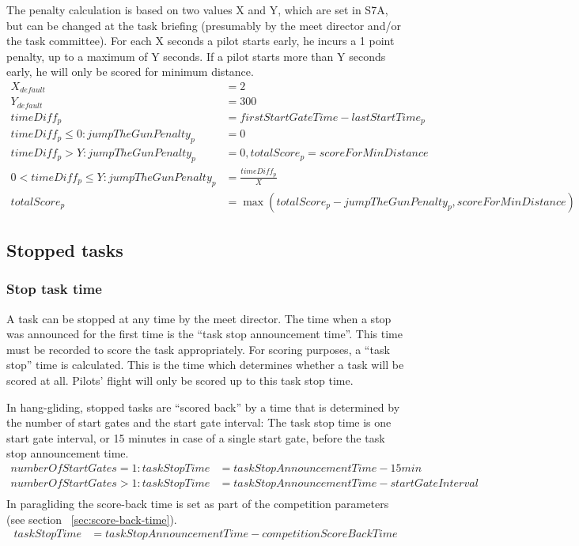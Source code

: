 \documentclass{article}
\begin{document}
The penalty calculation is based on two values X and Y, which are set in S7A, but can be changed at the
task briefing (presumably by the meet director and/or the task committee). For each X seconds a pilot
starts early, he incurs a 1 point penalty, up to a maximum of Y seconds. If a pilot starts more than Y
seconds early, he will only be scored for minimum distance.
\begin{align*}
    X_{default} &= 2 \\
    Y_{default} &= 300 \\
    timeDiff_p &= firstStartGateTime - lastStartTime_p \\
    timeDiff_p \leq 0 : jumpTheGunPenalty_p &= 0 \\
    timeDiff_p > Y : jumpTheGunPenalty_p &= 0, totalScore_p = scoreForMinDistance \\
    0 < timeDiff_p \leq Y : jumpTheGunPenalty_p &= \frac{timeDiff_p}{X} \\
    totalScore_p &= \max(totalScore_p - jumpTheGunPenalty_p, scoreForMinDistance)
\end{align*}

\subsection{Stopped tasks}
\subsubsection{Stop task time}
A task can be stopped at any time by the meet director. The time when a stop was announced for the
first time is the “task stop announcement time”. This time must be recorded to score the task
appropriately. For scoring purposes, a “task stop” time is calculated. This is the time which determines
whether a task will be scored at all. Pilots’ flight will only be scored up to this task stop time.

In hang-gliding, stopped tasks are “scored back” by a time that is determined by the number of start
gates and the start gate interval: The task stop time is one start gate interval, or 15 minutes in case of a
single start gate, before the task stop announcement time.
\begin{align*}
    numberOfStartGates = 1 : taskStopTime &= taskStopAnnouncementTime - 15min \\
    numberOfStartGates > 1 : taskStopTime &= taskStopAnnouncementTime - startGateInterval \\
\end{align*}
In paragliding the score-back time is set as part of the competition parameters (see section ~\ref{sec:score-back-time}).
\begin{align*}
    taskStopTime &= taskStopAnnouncementTime - competitionScoreBackTime \\
\end{align*}
\end{document}
